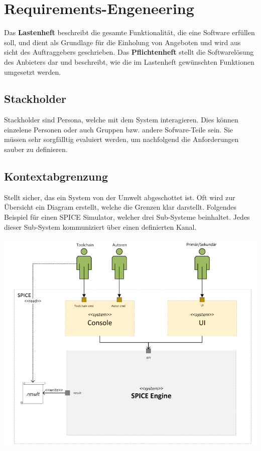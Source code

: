 \section{Requirements-Engeneering}
Das \textbf{Lastenheft} beschreibt die gesamte Funktionalität, die eine Software erfüllen soll, und dient als Grundlage für die Einholung von Angeboten und wird aus sicht des Auftraggebers geschrieben. Das \textbf{Pflichtenheft} stellt die Softwarelösung des Anbieters dar und beschreibt, wie die im Lastenheft gewünschten Funktionen umgesetzt werden.

\subsection{Stackholder}
Stackholder sind Persona, welche mit dem System interagieren. Dies können einzelene Personen oder auch Gruppen bzw. andere Sofware-Teile sein. Sie müssen sehr sorgfälltig evaluiert werden, um nachfolgend die Anforderungen sauber zu definieren.

\subsection{Kontextabgrenzung}
Stellt sicher, das ein System von der Umwelt abgeschottet ist. Oft wird zur Übersicht ein Diagram erstellt, welche die Grenzen klar darstellt. Folgendes Beispiel für einen SPICE Simulator, welcher drei Sub-Systeme beinhaltet. Jedes dieser Sub-System kommuniziert über einen definierten Kanal.
\begin{center}
	\includegraphics[width=\columnwidth]{Images/kontextabgrezung}
\end{center}

